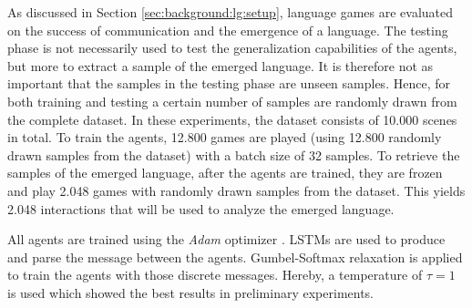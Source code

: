As discussed in Section \ref{sec:background:lg:setup}, language games are evaluated on the success of communication and the emergence of a language.
The testing phase is not necessarily used to test the generalization capabilities of the agents, but more to extract a sample of the emerged language.
It is therefore not as important that the samples in the testing phase are unseen samples.
Hence, for both training and testing a certain number of samples are randomly drawn from the complete dataset.
In these experiments, the dataset consists of 10.000 scenes in total.
To train the agents, 12.800 games are played (using 12.800 randomly drawn samples from the dataset) with a batch size of 32 samples.
To retrieve the samples of the emerged language, after the agents are trained, they are frozen and play 2.048 games with randomly drawn samples from the dataset.
This yields 2.048 interactions that will be used to analyze the emerged language.

All agents are trained using the \emph{Adam} optimizer \citep{Kingma2015}.
LSTMs are used to produce and parse the message between the agents.
Gumbel-Softmax relaxation is applied to train the agents with those discrete messages.
Hereby, a temperature of $\tau=1$ is used which showed the best results in preliminary experiments.